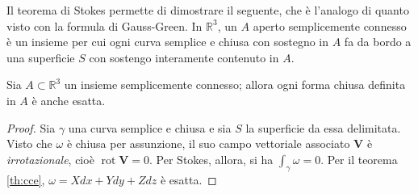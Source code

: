 \documentclass[10pt, a4paper]{scrartcl}
\theoremstyle{definition}
\numberwithin{esempio}{section}
\theoremstyle{definition}
\numberwithin{obs}{section}
\numberwithin{nota}{section}
\numberwithin{equation}{subsection}
\begin{document}
Il teorema di Stokes permette di dimostrare il seguente, che \`e l'analogo di quanto visto con la formula di Gauss-Green.
In $\mathbb{R}^3$, un $A$ aperto semplicemente connesso \`e un insieme per cui ogni curva semplice e chiusa con sostegno in $A$ fa da bordo a una superficie $S$ con sostengo interamente contenuto in $A$.
\begin{teorema}
	{}{}
Sia $A\subset \mathbb{R}^3$ un insieme semplicemente connesso; allora ogni forma chiusa definita in $A$ \`e anche esatta.
	\begin{proof}
	Sia $\gamma$ una curva semplice e chiusa e sia $S$ la superficie da essa delimitata.
	Visto che $\omega$ \`e chiusa per assunzione, il suo campo vettoriale associato $\mathbf{V} $ \`e \textit{irrotazionale}, cio\`e $\operatorname{rot} \mathbf{V} = 0$. 
	Per Stokes, allora, si ha $\int_{\gamma} \omega = 0$. 
	Per il teorema \ref{th:cce}, $\omega = Xdx + Ydy + Zdz$ \`e esatta.
	\end{proof}
\end{teorema}
\end{document}
